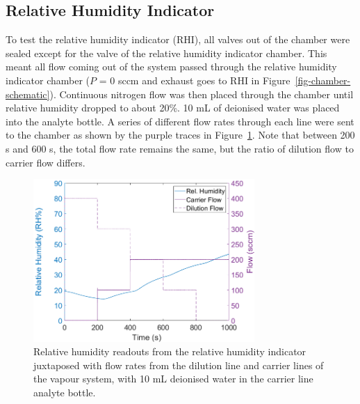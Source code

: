 \documentclass[
  a4paper,
]{scrbook}
\begin{document}
\hypertarget{relative-humidity-indicator}{%
\subsection{Relative Humidity
Indicator}\label{relative-humidity-indicator}}

To test the relative humidity indicator (RHI), all valves out of the
chamber were sealed except for the valve of the relative humidity
indicator chamber. This meant all flow coming out of the system passed
through the relative humidity indicator chamber (\(P\) = 0 sccm and
exhaust goes to RHI in Figure~\ref{fig-chamber-schematic}). Continuous
nitrogen flow was then placed through the chamber until relative
humidity dropped to about 20\%. 10 mL of deionised water was placed into
the analyte bottle. A series of different flow rates through each line
were sent to the chamber as shown by the purple traces in
Figure~\ref{fig-RHI-verification}. Note that between 200 s and 600 s,
the total flow rate remains the same, but the ratio of dilution flow to
carrier flow differs.

\begin{figure}

{\centering \includegraphics[width=0.75\textwidth,height=\textheight]{figures/ch9/RHI_verification.png}

}

\caption[Relative humidity readouts from the relative humidity indicator
juxtaposed with flow rates from the dilution line and carrier lines of
the vapour system.]{\label{fig-RHI-verification}Relative humidity
readouts from the relative humidity indicator juxtaposed with flow rates
from the dilution line and carrier lines of the vapour system, with 10
mL deionised water in the carrier line analyte bottle.}

\end{figure}
\end{document}
